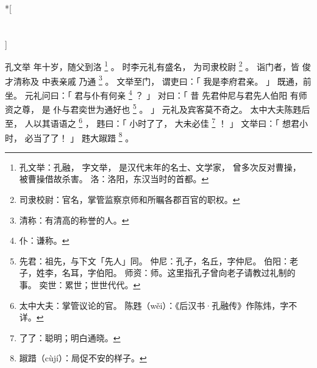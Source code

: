 
\switchcolumn[0]*[\section{}]

孔文举
年十岁，随父到洛%
\footnote{%
    孔文举：孔融，
            字文举，
            是汉代末年的名士、文学家，
            曾多次反对曹操，
            被曹操借故杀害。
    洛：洛阳，东汉当时的首都。
}%
。
时李元礼有盛名，
为司隶校尉%
\footnote{%
    司隶校尉：官名，掌管监察京师和所瞩各郡百官的职权。
}%
。
诣门者，皆
    俊才清称及
    中表亲戚
乃通%
\footnote{%
    清称：有清高的称誉的人。
}%
。
文举至门，
谓吏曰：「
    我是李府君亲。
」
既通，前坐。
元礼问曰：「
    君与仆有何亲%
    \footnote{%
        仆：谦称。
    }%
    ？
」
对曰：「
    昔
    先君仲尼与君先人伯阳
    有师资之尊，
    是
    仆与君奕世为通好也%
    \footnote{%
        先君：祖先，与下文「先人」同。
        仲尼：孔子，名丘，字仲尼。
        伯阳：老子，姓李，名耳，字伯阳。
        师资：师。这里指孔子曾向老子请教过礼制的事。
        奕世：累世；世世代代。
    }%
    。
」
元礼及宾客莫不奇之。
太中大夫陈韪后至，
人以其语语之%
\footnote{%
    太中大夫：掌管议论的官。
    陈韪（wěi）：《后汉书·孔融传》作陈炜，字不详。
}%
，
韪曰：「
    小时了了，
    大未必佳%
    \footnote{%
        了了：聪明；明白通晓。
    }%
    ！
」
文举曰：「
    想君小时，
    必当了了！
」
韪大踧踖%
\footnote{%
    踧踖（cùjí）：局促不安的样子。
}%
。

\switchcolumn


